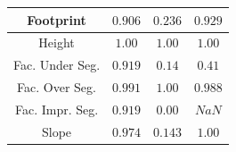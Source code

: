 \documentclass[portrait, a0paper, margin=.5cm]{baposter}
\begin{document}
\begin{poster}
{\begin{center}
\begin{tabular}{c c c c}
                    \midrule
                    Footprint & $0.906$ & $0.236$ & $0.929$ \\
                    \midrule
                    Height & $1.00$ & $1.00$ & $1.00$ \\
                    \midrule
                    Fac. Under Seg. & $0.919$ & $0.14$ & $0.41$ \\
                    \midrule
                    Fac. Over Seg. & $0.991$ & $1.00$ & $0.988$ \\
                    \midrule
                    Fac. Impr. Seg. & $0.919$ & $0.00$ & $NaN$\\
                    \midrule
                    Slope & $0.974$ & $0.143$ & $1.00$\\
                    \bottomrule
                \end{tabular}
            \end{center}
            \vspace{.1cm}
        }


\end{poster}
\end{document}
